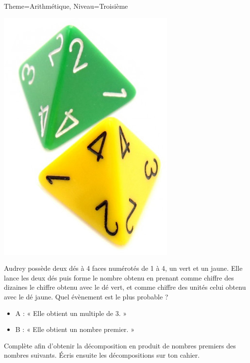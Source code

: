 \documentclass[11pt]{article}
\begin{document}
\begin{multicols}{2}
\begin{Maquette}[Fiche]{Theme=Arithmétique, Niveau=Troisième}
        \begin{exercice}
            \begin{center}
                \includegraphics[width=.5\linewidth]{Images/Dés4faces.png}
            \end{center}
            Audrey possède deux dés à 4 faces numérotés de 1 à 4, un vert et un jaune.
            Elle lance les deux dés puis forme le nombre obtenu en prenant comme chiffre des dizaines le chiffre obtenu avec le dé vert, et comme chiffre des unités celui obtenu avec le dé jaune. Quel évènement est le plus probable ?
            \begin{itemize}
                \item A : « Elle obtient un multiple de 3. »
                \item B : « Elle obtient un nombre premier. »
            \end{itemize}
        \end{exercice}

        \columnbreak

        \begin{exercice}
            Complète afin d’obtenir la décomposition en produit de nombres premiers des nombres suivants. Écris ensuite les décompositions sur ton cahier.
            \begin{multicols}{3}
            \end{multicols}
            \begin{multicols}{3}
            \end{multicols}
        \end{exercice}


\end{Maquette}
\end{multicols}
\end{document}
